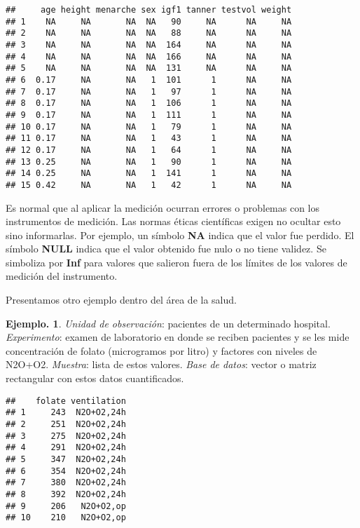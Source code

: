 \documentclass[]{book}
\theoremstyle{definition}
\theoremstyle{definition}
\newtheorem{example}{Ejemplo.}[chapter]
\theoremstyle{definition}
\theoremstyle{remark}
\begin{document}
\begin{verbatim}
##     age height menarche sex igf1 tanner testvol weight
## 1    NA     NA       NA  NA   90     NA      NA     NA
## 2    NA     NA       NA  NA   88     NA      NA     NA
## 3    NA     NA       NA  NA  164     NA      NA     NA
## 4    NA     NA       NA  NA  166     NA      NA     NA
## 5    NA     NA       NA  NA  131     NA      NA     NA
## 6  0.17     NA       NA   1  101      1      NA     NA
## 7  0.17     NA       NA   1   97      1      NA     NA
## 8  0.17     NA       NA   1  106      1      NA     NA
## 9  0.17     NA       NA   1  111      1      NA     NA
## 10 0.17     NA       NA   1   79      1      NA     NA
## 11 0.17     NA       NA   1   43      1      NA     NA
## 12 0.17     NA       NA   1   64      1      NA     NA
## 13 0.25     NA       NA   1   90      1      NA     NA
## 14 0.25     NA       NA   1  141      1      NA     NA
## 15 0.42     NA       NA   1   42      1      NA     NA
\end{verbatim}

Es normal que al aplicar la medición ocurran errores o
problemas con los instrumentos de medición.
Las normas éticas científicas exigen no ocultar esto sino
informarlas. Por ejemplo,
un símbolo \textbf{NA} indica que el valor fue perdido. El
símbolo \textbf{NULL} indica que el valor
obtenido fue nulo o no tiene validez. Se simboliza por
\textbf{Inf} para valores que salieron fuera de
los límites de los valores de medición del instrumento.

Presentamos otro ejemplo dentro del área de la salud.

\begin{example}
\protect\hypertarget{exm:unnamed-chunk-47}{}{\label{exm:unnamed-chunk-47} }\emph{Unidad de observación}: pacientes de un determinado
hospital. \emph{Experimento}: examen de
laboratorio en donde se reciben pacientes y se les mide
concentración de folato (microgramos por
litro) y factores con niveles de N2O+O2. \emph{Muestra}:
lista de estos valores. \emph{Base de datos}:
vector o matriz rectangular con estos datos
cuantificados.\\
\end{example}

\begin{verbatim}
##    folate ventilation
## 1     243  N2O+O2,24h
## 2     251  N2O+O2,24h
## 3     275  N2O+O2,24h
## 4     291  N2O+O2,24h
## 5     347  N2O+O2,24h
## 6     354  N2O+O2,24h
## 7     380  N2O+O2,24h
## 8     392  N2O+O2,24h
## 9     206   N2O+O2,op
## 10    210   N2O+O2,op
\end{verbatim}
\end{document}
